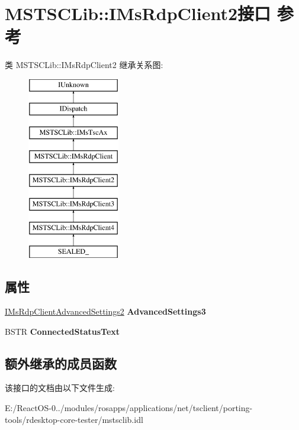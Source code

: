 \hypertarget{interface_m_s_t_s_c_lib_1_1_i_ms_rdp_client2}{}\section{M\+S\+T\+S\+C\+Lib\+:\+:I\+Ms\+Rdp\+Client2接口 参考}
\label{interface_m_s_t_s_c_lib_1_1_i_ms_rdp_client2}
类 M\+S\+T\+S\+C\+Lib\+:\+:I\+Ms\+Rdp\+Client2 继承关系图\+:\begin{figure}[H]
\begin{center}
\leavevmode
\includegraphics[height=8.000000cm]{interface_m_s_t_s_c_lib_1_1_i_ms_rdp_client2}
\end{center}
\end{figure}
\subsection*{属性}
\begin{DoxyCompactItemize}
\item 
\mbox{\label{interface_m_s_t_s_c_lib_1_1_i_ms_rdp_client2_aeb8f4f085caa65d92e25b62260aa8005}} 
\hyperlink{interface_m_s_t_s_c_lib_1_1_i_ms_rdp_client_advanced_settings2}{I\+Ms\+Rdp\+Client\+Advanced\+Settings2} {\bfseries Advanced\+Settings3}
\item 
\mbox{\label{interface_m_s_t_s_c_lib_1_1_i_ms_rdp_client2_acce061742d3b4a934a5791592c694817}} 
B\+S\+TR {\bfseries Connected\+Status\+Text}
\end{DoxyCompactItemize}
\subsection*{额外继承的成员函数}


该接口的文档由以下文件生成\+:\begin{DoxyCompactItemize}
\item 
E\+:/\+React\+O\+S-\/0../modules/rosapps/applications/net/tsclient/porting-\/tools/rdesktop-\/core-\/tester/mstsclib.\+idl\end{DoxyCompactItemize}
